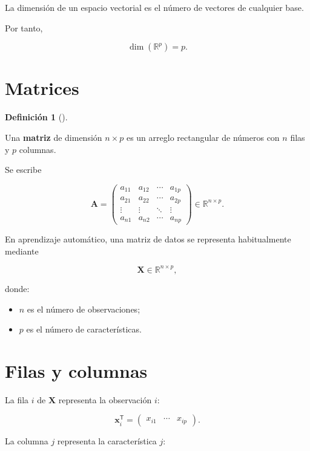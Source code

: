 \documentclass[
  spanish,
  11pt,
  letterpaper,
  DIV=11,
  numbers=noendperiod]{scrreprt}
\providecommand{\tightlist}{%
  \setlength{\itemsep}{0pt}\setlength{\parskip}{0pt}}
\theoremstyle{definition}
\newtheorem{definition}{Definición}[chapter]
\theoremstyle{plain}
\theoremstyle{definition}
\theoremstyle{remark}
\begin{document}
La dimensión de un espacio vectorial es el número de vectores de
cualquier base.

Por tanto,

\[
\dim(\mathbb{R}^{p})=p.
\]

\section{Matrices}\label{matrices}

\begin{definition}[]\protect\hypertarget{def-matriz}{}\label{def-matriz}

Una \textbf{matriz} de dimensión \(n\times p\) es un arreglo rectangular
de números con \(n\) filas y \(p\) columnas.

\end{definition}

Se escribe

\[
\mathbf{A}
=
\begin{pmatrix}
a_{11} & a_{12} & \cdots & a_{1p}\\
a_{21} & a_{22} & \cdots & a_{2p}\\
\vdots & \vdots & \ddots & \vdots\\
a_{n1} & a_{n2} & \cdots & a_{np}
\end{pmatrix}
\in\mathbb{R}^{n\times p}.
\]

En aprendizaje automático, una matriz de datos se representa
habitualmente mediante

\[
\mathbf{X}\in\mathbb{R}^{n\times p},
\]

donde:

\begin{itemize}
\tightlist
\item
  \(n\) es el número de observaciones;
\item
  \(p\) es el número de características.
\end{itemize}

\section{Filas y columnas}\label{filas-y-columnas}

La fila \(i\) de \(\mathbf{X}\) representa la observación \(i\):

\[
\mathbf{x}_i^{\mathsf T}
=
\begin{pmatrix}
x_{i1} & \cdots & x_{ip}
\end{pmatrix}.
\]

La columna \(j\) representa la característica \(j\):
\end{document}

